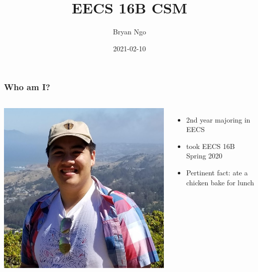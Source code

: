 \documentclass[aspectratio=169]{beamer}
\title{EECS 16B CSM}
\author{Bryan Ngo}
\date{2021-02-10}
\institute{Computer Science Mentors}
\begin{document}
\begin{frame}
    \maketitle
\end{frame}

\begin{frame}
    \tableofcontents
\end{frame}

\begin{frame}
    \frametitle{Who am I?}

    \begin{columns}
        \includegraphics[width=0.8\textheight]{bryan_ngo.png}

        \begin{itemize}
            \item 2nd year majoring in EECS
            \item took EECS 16B Spring 2020
            \item Pertinent fact: ate a chicken bake for lunch
        \end{itemize}
    \end{columns}
\end{frame}
\end{document}
